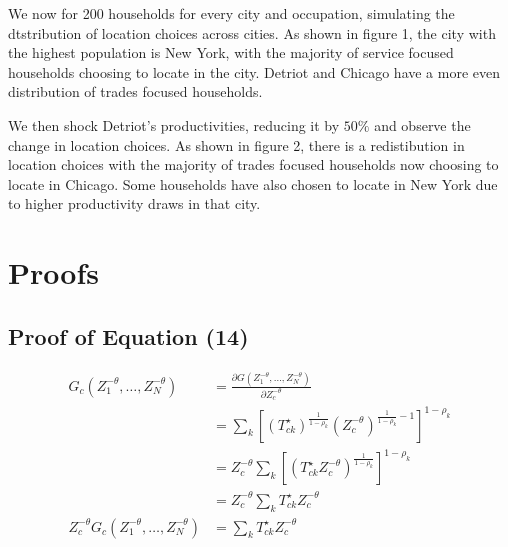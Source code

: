 \documentclass[10pt]{article}
\begin{document}
We now for 200 households for every city and occupation, simulating the dtstribution of location choices across cities. As shown in figure 1, the city with the highest population is New York, with the majority of service focused households choosing to locate in the city. Detriot and Chicago have a more even distribution of trades focused households.

We then shock Detriot's productivities, reducing it by $50\%$ and observe the change in location choices. As shown in figure 2, there is a redistibution in location choices with the majority of trades focused households now choosing to locate in Chicago. Some households have also chosen to locate in New York due to higher productivity draws in that city.

\newpage

\section{Proofs}

\subsection{Proof of Equation (14)}

\begin{align*}
    G_c (Z_1^{-\theta}, \dots, Z_N^{-\theta})               & = \frac{\partial G(Z_1^{-\theta}, \dots, Z_N^{-\theta})}{\partial Z_c^{-\theta}}                                 \\
                                                            & = \sum_{k}^{} [(T_{ck}^{\star} )^{\frac{1}{1 - \rho_k}} (Z_c^{-\theta})^{\frac{1}{1 - \rho_k} - 1}]^{1 - \rho_k} \\
                                                            & = Z_c^{-\theta} \sum_{k}^{} [(T_{ck}^{\star} Z_c^{-\theta} )^{\frac{1}{1 - \rho_k}}]^{1 - \rho_k}                \\
                                                            & = Z_c^{-\theta} \sum_{k}^{} T_{ck}^{\star} Z_c^{-\theta}                                                         \\
    Z_c^{-\theta} G_c (Z_1^{-\theta}, \dots, Z_N^{-\theta}) & = \sum_{k}^{} T_{ck}^{\star}  Z_c^{-\theta}
\end{align*}
\end{document}
